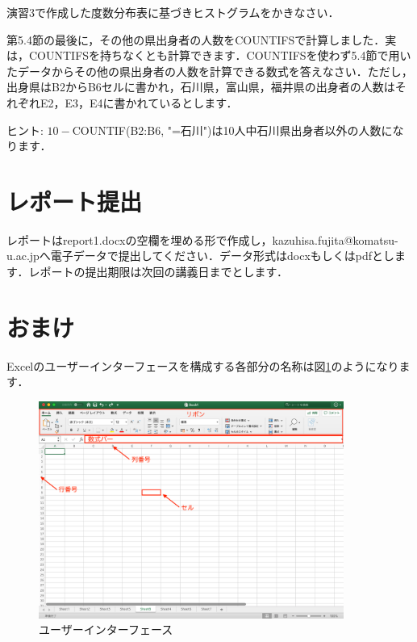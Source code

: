 \practice
 演習3で作成した度数分布表に基づきヒストグラムをかきなさい．

\practice
第5.4節の最後に，その他の県出身者の人数をCOUNTIFSで計算しました．実は，COUNTIFSを持ちなくとも計算できます．COUNTIFSを使わず5.4節で用いたデータからその他の県出身者の人数を計算できる数式を答えなさい．ただし，出身県はB2からB6セルに書かれ，石川県，富山県，福井県の出身者の人数はそれぞれE2，E3，E4に書かれているとします．

ヒント: $10-$COUNTIF(B2:B6, "=石川")は10人中石川県出身者以外の人数になります．

\section{レポート提出}

レポートはreport1.docxの空欄を埋める形で作成し，kazuhisa.fujita@komatsu-u.ac.jpへ電子データで提出してください．データ形式はdocxもしくはpdfとします．レポートの提出期限は次回の講義日までとします．

\section{おまけ}

Excelのユーザーインターフェースを構成する各部分の名称は図\ref{fig:ui}のようになります．

\begin{figure}[htbp]
    \centering
    \includegraphics[width=10cm]{chap1/ui.png}
    \caption{ユーザーインターフェース}
    \label{fig:ui}
\end{figure}
